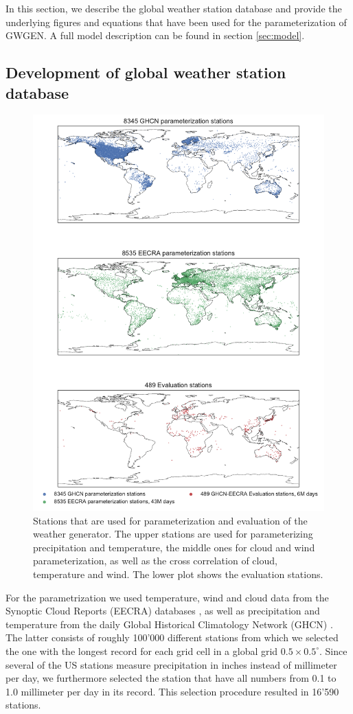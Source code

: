 \begin{refsection}
In this section, we describe the global weather station database and provide the underlying figures and equations that have been used for the parameterization of GWGEN. A full model description can be found in section \ref{sec:model}.

\subsection{Development of global weather station database}
\begin{figure}
	\includegraphics[width=12cm]{figures/stations_plot.pdf}
	\caption[Stations that are used for parameterization and evaluation of the weather generator.]{Stations that are used for parameterization and evaluation of the weather generator. The upper stations are used for parameterizing precipitation and temperature, the middle ones for cloud and wind parameterization, as well as the cross correlation of cloud, temperature and wind. The lower plot shows the
		evaluation stations.}
	\label{fig:stations}
\end{figure}
For the parametrization we used temperature, wind and cloud data from the Synoptic Cloud Reports (EECRA) databases \citep{HahnWarren1999}, as well as precipitation and temperature from the daily Global Historical Climatology Network (GHCN) \citep{MenneDurreVoseEtAl2012,Menne2012}. The latter consists of roughly 100'000 different stations from which we selected the one with the longest record for each grid cell in a global grid $0.5\times0.5^\circ$. Since several of the US stations measure precipitation in inches instead of millimeter per day, we furthermore selected the station that have all numbers from 0.1 to 1.0 millimeter per day in its record. This selection procedure resulted in 16'590 stations.


\end{refsection}
